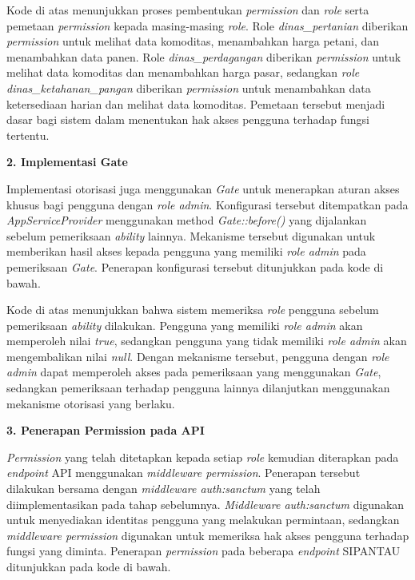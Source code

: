 Kode di atas menunjukkan proses pembentukan \textit{permission} dan \textit{role} serta pemetaan \textit{permission} kepada masing-masing \textit{role}. Role \textit{dinas\_pertanian} diberikan \textit{permission} untuk melihat data komoditas, menambahkan harga petani, dan menambahkan data panen. Role \textit{dinas\_perdagangan} diberikan \textit{permission} untuk melihat data komoditas dan menambahkan harga pasar, sedangkan \textit{role dinas\_ketahanan\_pangan} diberikan \textit{permission} untuk menambahkan data ketersediaan harian dan melihat data komoditas. Pemetaan tersebut menjadi dasar bagi sistem dalam menentukan hak akses pengguna terhadap fungsi tertentu.

\vspace{0.5em}
\noindent\textbf{2. Implementasi Gate}
\vspace{0.5em}

Implementasi otorisasi juga menggunakan \textit{Gate} untuk menerapkan aturan akses khusus bagi pengguna dengan \textit{role admin}. Konfigurasi tersebut ditempatkan pada \textit{AppServiceProvider} menggunakan method \textit{Gate::before()} yang dijalankan sebelum pemeriksaan \textit{ability} lainnya. Mekanisme tersebut digunakan untuk memberikan hasil akses kepada pengguna yang memiliki \textit{role admin} pada pemeriksaan \textit{Gate}. Penerapan konfigurasi tersebut ditunjukkan pada kode di bawah.

\begin{code}
\end{code}

Kode di atas menunjukkan bahwa sistem memeriksa \textit{role} pengguna sebelum pemeriksaan \textit{ability} dilakukan. Pengguna yang memiliki \textit{role admin} akan memperoleh nilai \textit{true}, sedangkan pengguna yang tidak memiliki \textit{role admin} akan mengembalikan nilai \textit{null}. Dengan mekanisme tersebut, pengguna dengan \textit{role admin} dapat memperoleh akses pada pemeriksaan yang menggunakan \textit{Gate}, sedangkan pemeriksaan terhadap pengguna lainnya dilanjutkan menggunakan mekanisme otorisasi yang berlaku.

\vspace{0.5em}
\noindent\textbf{3. Penerapan Permission pada API}
\vspace{0.5em}

\textit{Permission} yang telah ditetapkan kepada setiap \textit{role} kemudian diterapkan pada \textit{endpoint} API menggunakan \textit{middleware permission}. Penerapan tersebut dilakukan bersama dengan \textit{middleware auth:sanctum} yang telah diimplementasikan pada tahap sebelumnya. \textit{Middleware auth:sanctum} digunakan untuk menyediakan identitas pengguna yang melakukan permintaan, sedangkan \textit{middleware permission} digunakan untuk memeriksa hak akses pengguna terhadap fungsi yang diminta. Penerapan \textit{permission} pada beberapa \textit{endpoint} SIPANTAU ditunjukkan pada kode di bawah.

